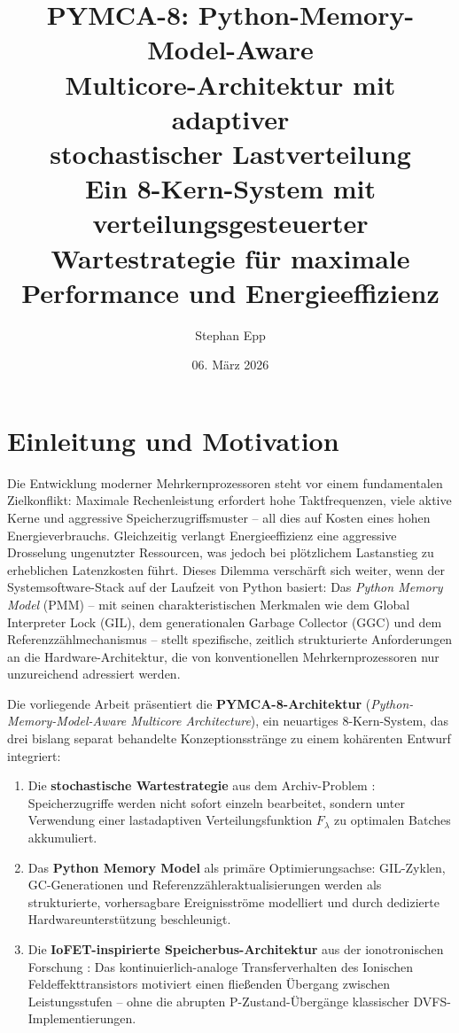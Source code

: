﻿\documentclass[a4paper,12pt]{scrreprt}
\title{\textbf{PYMCA-8: Python-Memory-Model-Aware\\
		Multicore-Architektur mit adaptiver\\
		stochastischer Lastverteilung}\\[0.5em]
	\large Ein 8-Kern-System mit verteilungsgesteuerter\\
	Wartestrategie für maximale Performance und Energieeffizienz}
\author{Stephan Epp}
\date{06. März 2026}
\theoremstyle{definition}
\begin{document}
	
	\maketitle
	\tableofcontents
	\newpage
	
	\section{Einleitung und Motivation}
	
	Die Entwicklung moderner Mehrkernprozessoren steht vor einem fundamentalen
	Zielkonflikt: Maximale Rechenleistung erfordert hohe Taktfrequenzen, viele
	aktive Kerne und aggressive Speicherzugriffsmuster -- all dies auf Kosten
	eines hohen Energieverbrauchs. Gleichzeitig verlangt Energieeffizienz eine
	aggressive Drosselung ungenutzter Ressourcen, was jedoch bei plötzlichem
	Lastanstieg zu erheblichen Latenzkosten führt. Dieses Dilemma verschärft sich
	weiter, wenn der Systemsoftware-Stack auf der Laufzeit von Python basiert:
	Das \emph{Python Memory Model} (PMM) -- mit seinen charakteristischen
	Merkmalen wie dem Global Interpreter Lock (GIL), dem generationalen
	Garbage Collector (GGC) und dem Referenzzählmechanismus -- stellt
	spezifische, zeitlich strukturierte Anforderungen an die Hardware-Architektur,
	die von konventionellen Mehrkernprozessoren nur unzureichend adressiert werden.
	
	Die vorliegende Arbeit präsentiert die \textbf{PYMCA-8-Architektur}
	(\emph{Python-Memory-Model-Aware Multicore Architecture}), ein neuartiges
	8-Kern-System, das drei bislang separat behandelte Konzeptionsstränge
	zu einem kohärenten Entwurf integriert:
	
	\begin{enumerate}[noitemsep]
		\item Die \textbf{stochastische Wartestrategie} aus dem Archiv-Problem
		\cite{epp2026archiv}: Speicherzugriffe werden nicht sofort einzeln
		bearbeitet, sondern unter Verwendung einer lastadaptiven
		Verteilungsfunktion $F_\lambda$ zu optimalen Batches akkumuliert.
		\item Das \textbf{Python Memory Model} als primäre Optimierungsachse:
		GIL-Zyklen, GC-Generationen und Referenzzähleraktualisierungen
		werden als strukturierte, vorhersagbare Ereignisströme modelliert
		und durch dedizierte Hardwareunterstützung beschleunigt.
		\item Die \textbf{IoFET-inspirierte Speicherbus-Architektur} aus der
		ionotronischen Forschung \cite{epp2026iono}: Das kontinuierlich-analoge
		Transferverhalten des Ionischen Feldeffekttransistors motiviert
		einen fließenden Übergang zwischen Leistungsstufen -- ohne die
		abrupten P-Zustand-Übergänge klassischer DVFS-Implementierungen.
	\end{enumerate}
	
\end{document}
